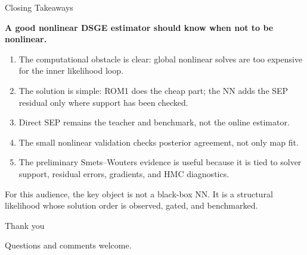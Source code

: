 \documentclass[aspectratio=169,10pt]{beamer}
\newcommand{\smallnote}[1]{%
  \vspace{0.25em}
  \begin{center}
  \parbox{0.92\linewidth}{\centering\footnotesize #1}
  \end{center}
}
\newcommand{\claim}[1]{%
  \begin{center}
  \parbox{0.94\linewidth}{\centering\large\bfseries #1}
  \end{center}
}
\begin{document}
\begin{frame}{Closing Takeaways}
\claim{A good nonlinear DSGE estimator should know when not to be nonlinear.}

\vspace{0.35em}
\begin{enumerate}
  \item The computational obstacle is clear: global nonlinear solves are too
        expensive for the inner likelihood loop.
  \item The solution is simple: ROM1 does the cheap part; the NN adds the
        SEP residual only where support has been checked.
  \item Direct SEP remains the teacher and benchmark, not the online estimator.
  \item The small nonlinear validation checks posterior agreement, not only map fit.
  \item The preliminary Smets--Wouters evidence is useful because it is tied to
        solver support, residual errors, gradients, and HMC diagnostics.
\end{enumerate}

\smallnote{For this audience, the key object is not a black-box NN. It is a structural likelihood whose solution order is observed, gated, and benchmarked.}
\end{frame}

\begin{frame}
\begin{center}
\Large Thank you

\vspace{1em}
\normalsize Questions and comments welcome.
\end{center}
\end{frame}

\appendix
\end{document}
